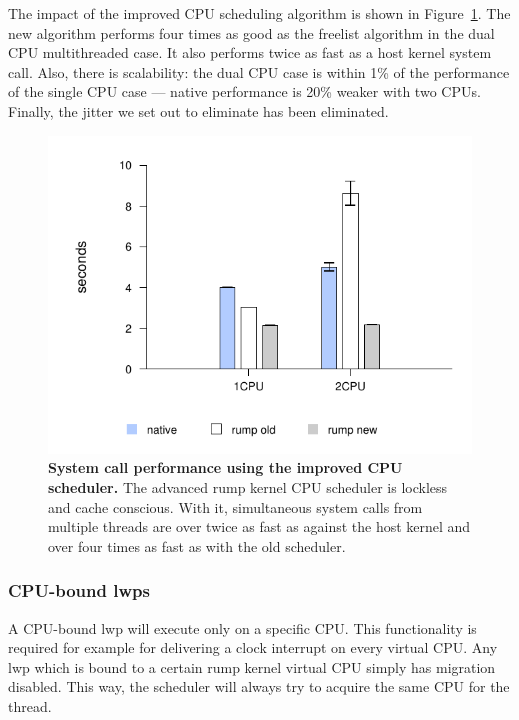 The impact of the improved CPU scheduling algorithm is shown in
Figure~\ref{fig:syscall_proalgo}.  The new algorithm performs four
times as good as the freelist algorithm in the dual CPU multithreaded
case.  It also performs twice as fast as a host kernel system call.
Also, there is scalability: the dual CPU case is within 1\% of the
performance of the single CPU case --- native performance is 20\%
weaker with two CPUs.  Finally, the jitter we set out to eliminate
has been eliminated.

\begin{figure}[t]
\includegraphics{sched2}
\caption[System call performance using the improved CPU scheduler]{
\textbf{System call performance using the improved CPU scheduler.}
The advanced rump kernel CPU scheduler is lockless and cache conscious.
With it, simultaneous system calls from multiple threads are over
twice as fast as against the host kernel and over four times as fast as
with the old scheduler.}
\label{fig:syscall_proalgo}
\end{figure}

\subsubsection*{CPU-bound lwps}

A CPU-bound lwp will execute only on a specific CPU.  This
functionality is required for example for delivering a clock
interrupt on every virtual CPU.  Any lwp which is bound to a certain
rump kernel virtual CPU simply has migration disabled.  This way,
the scheduler will always try to acquire the same CPU for the
thread.

